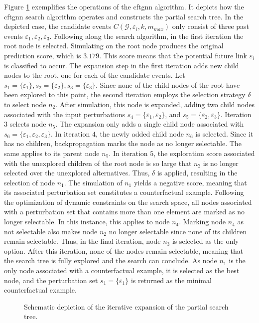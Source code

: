 Figure \ref{f_search_example} exemplifies the operations of the \gls{cftgnn} algorithm. It depicts how the \gls{cftgnn} search algorithm operates and constructs the partial search tree. In the depicted case, the candidate events ${C(\mathcal{G}, \varepsilon_i, k, m_{max})}$ only consist of three past events $\varepsilon_1, \varepsilon_2, \varepsilon_3$. Following along the search algorithm, in the first iteration the root node is selected. Simulating on the root node produces the original prediction score, which is $3.179$. This score means that the potential future link $\varepsilon_i$ is classified to occur. The expansion step in the first iteration adds new child nodes to the root, one for each of the candidate events. Let $s_1 = \{\varepsilon_1\}, s_2 = \{\varepsilon_2\}, s_3 = \{\varepsilon_3\}$. Since none of the child nodes of the root have been explored to this point, the second iteration employs the selection strategy $\delta$ to select node $n_2$. After simulation, this node is expanded, adding two child nodes associated with the input perturbations $s_4 = \{\varepsilon_1, \varepsilon_2\}$, and $s_5 = \{\varepsilon_2, \varepsilon_3\}$. Iteration $3$ selects node $n_5$. The expansion only adds a single child node associated with $s_6 = \{\varepsilon_1, \varepsilon_2, \varepsilon_3\}$. In iteration $4$, the newly added child node $n_6$ is selected. Since it has no children, backpropagation marks the node as no longer selectable. The same applies to its parent node $n_5$. In iteration $5$, the exploration score associated with the unexplored children of the root node is so large that $n_2$ is no longer selected over the unexplored alternatives. Thus, $\delta$ is applied, resulting in the selection of node $n_1$. The simulation of $n_1$ yields a negative score, meaning that its associated perturbation set constitutes a counterfactual example. Following the optimization of dynamic constraints on the search space, all nodes associated with a perturbation set that contains more than one element are marked as no longer selectable. In this instance, this applies to node $n_4$. Marking node $n_4$ as not selectable also makes node $n_2$ no longer selectable since none of its children remain selectable. Thus, in the final iteration, node $n_3$ is selected as the only option. After this iteration, none of the nodes remain selectable, meaning that the search tree is fully explored and the search can conclude. As node $n_1$ is the only node associated with a counterfactual example, it is selected as the best node, and the perturbation set $s_1 = \{\varepsilon_1\}$ is returned as the minimal counterfactual example.


\begin{figure}[ht!]
    \centering
    
    \caption{Schematic depiction of the iterative expansion of the partial search tree.}
    \label{f_search_example}
\end{figure}